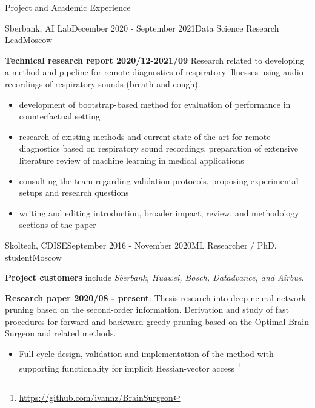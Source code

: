 \documentclass{resume} %
\begin{document}
\begin{rSection}{Project and Academic Experience}
\begin{rSubsection}{Sberbank, AI Lab}{December 2020 - September 2021}{Data Science Research Lead}{Moscow}
    \item \textbf{Technical research report 2020/12-2021/09}
    Research related to developing a method and pipeline for remote diagnostics of respiratory
    illnesses using audio recordings of respiratory sounds (breath and cough).
    \begin{itemize}
        \item development of bootstrap-based method for evaluation of performance in
        counterfactual setting  %
        
        \item research of existing methods and current state of the art for remote diagnostics
        based on respiratory sound recordings, preparation of extensive literature review of
        machine learning in medical applications
        
        \item consulting the team regarding validation protocols, proposing experimental
        setups and research questions
        
        \item writing and editing introduction, broader impact, review, and methodology sections 
        of the paper
    \end{itemize}
\end{rSubsection}

\begin{rSubsection}{Skoltech, CDISE}{September 2016 - November 2020}{ML Researcher / PhD. student}{Moscow}
    \item \textbf{Project customers} include \emph{Sberbank, Huawei, Bosch, Datadvance, and Airbus}.

    \bigskip
    \item \textbf{Research paper 2020/08 - present}:
    Thesis research into deep neural network pruning based on the second-order information.
    Derivation and study of fast procedures for forward and backward greedy pruning based
    on the Optimal Brain Surgeon and related methods.
    \begin{itemize}
        \item Full cycle design, validation and implementation of the method with supporting
        functionality for implicit Hessian-vector access%
            \footnote{\url{https://github.com/ivannz/BrainSurgeon}}


\end{itemize}
\end{rSubsection}
\end{rSection}
\end{document}
